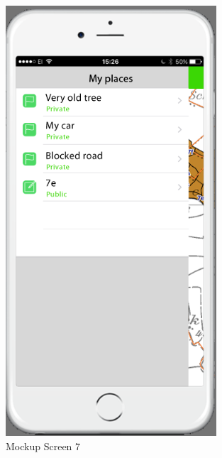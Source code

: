 \begin{figure}[H]
\centering
    \includegraphics[width=0.7\textwidth]{mockup1-7}
    \caption{Mockup Screen 7}
    \label{fig:mesh7}
\end{figure}

